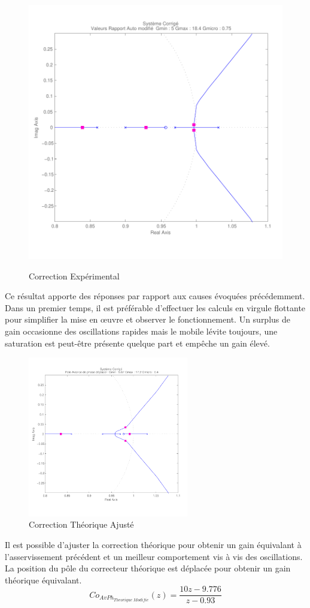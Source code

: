 \documentclass[11pt, french]{article} %
\begin{document}
\begin{figure}[h!]
	\centering
	\includegraphics[width = 13cm,trim=0 1.4cm 0 0.7cm ,clip=true]
					{SolutionNumerique/SystemeCorrigeSolex.pdf}
	\label{CorrExpe}	
	\caption{Correction Expérimental}
\end{figure}

Ce résultat apporte des réponses par rapport aux causes évoquées précédemment. Dans un premier temps, il est préférable d'effectuer les calculs en virgule flottante pour simplifier la mise en œuvre et observer le fonctionnement. Un surplus de gain occasionne des oscillations rapides mais le mobile lévite toujours, une saturation est peut-être présente quelque part et empêche un gain élevé.

\begin{figure}
	\vspace{-0.5cm}
	\includegraphics[width = 7cm,trim=0 1.4cm 0 0.7cm ,clip=true]
					{SolutionNumerique/SystemeCorrigeThoriqueAdapte.pdf}
	\caption{Correction Théorique Ajusté}
\end{figure}
Il est possible d'ajuster la correction théorique pour obtenir un gain équivalant à l'asservissement précédent et un meilleur comportement vis à vis des oscillations. La position du pôle du correcteur théorique est déplacée pour obtenir un gain théorique équivalant. 
\[  Co_{AvPh_{Theorique \; Modifie}}(z) = \dfrac {10z - 9.776} {z - 0.93} \]
\end{document}

